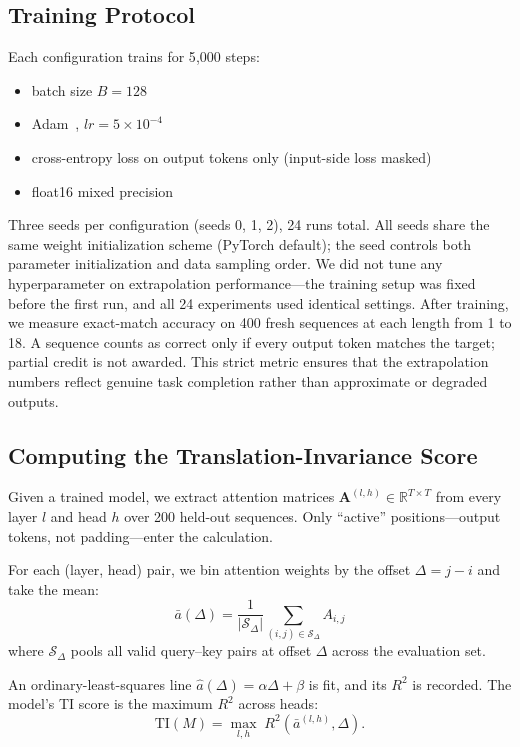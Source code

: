 \documentclass[10pt,twocolumn]{article}
\begin{document}
\subsection{Training Protocol}
\label{sec:training}

Each configuration trains for 5{,}000 steps:
\begin{itemize}
  \item batch size $B = 128$
  \item Adam~\cite{kingma2015adam}, $lr = 5 \times 10^{-4}$
  \item cross-entropy loss on output tokens only (input-side loss masked)
  \item float16 mixed precision
\end{itemize}
Three seeds per configuration (seeds 0, 1, 2), 24 runs total.
All seeds share the same weight initialization scheme (PyTorch default); the seed controls both parameter initialization and data sampling order.
We did not tune any hyperparameter on extrapolation performance---the training setup was fixed before the first run, and all 24 experiments used identical settings.
After training, we measure exact-match accuracy on 400 fresh sequences at each length from 1 to 18.
A sequence counts as correct only if every output token matches the target; partial credit is not awarded.
This strict metric ensures that the extrapolation numbers reflect genuine task completion rather than approximate or degraded outputs.

\subsection{Computing the Translation-Invariance Score}
\label{sec:ti}

Given a trained model, we extract attention matrices $\mathbf{A}^{(l,h)} \in \mathbb{R}^{T \times T}$ from every layer $l$ and head $h$ over 200 held-out sequences.
Only ``active'' positions---output tokens, not padding---enter the calculation.

For each (layer, head) pair, we bin attention weights by the offset $\Delta = j - i$ and take the mean:
\begin{equation}
  \bar{a}(\Delta) = \frac{1}{|\mathcal{S}_\Delta|} \sum_{(i,j) \in \mathcal{S}_\Delta} A_{i,j}
  \label{eq:mean_attn}
\end{equation}
where $\mathcal{S}_\Delta$ pools all valid query--key pairs at offset $\Delta$ across the evaluation set.

An ordinary-least-squares line $\hat{a}(\Delta) = \alpha\Delta + \beta$ is fit, and its $R^2$ is recorded.
The model's TI score is the maximum $R^2$ across heads:
\begin{equation}
  \text{TI}(M) = \max_{l,h}\; R^2\!\left(\bar{a}^{(l,h)}, \Delta\right).
  \label{eq:ti}
\end{equation}
\end{document}
